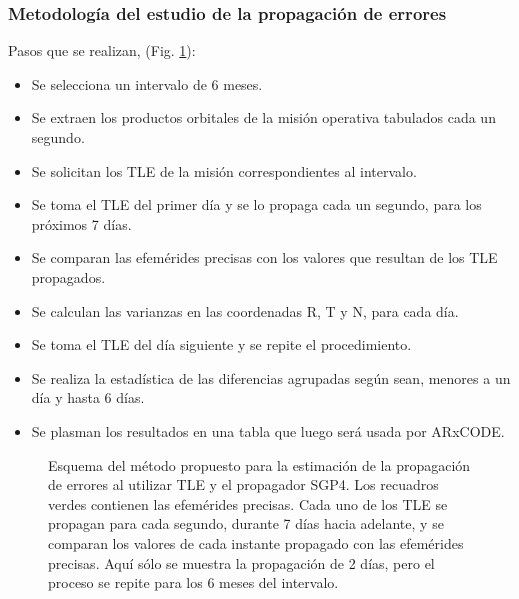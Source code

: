 {\subsubsection*{Metodolog\'ia del estudio de la propagaci\'on de errores}\label{subsec:errorProp}
Pasos que se realizan, (Fig. \ref{fig:metodotabla}):
\begin{itemize}
\itemsep0em
\item Se selecciona un intervalo de 6 meses.
\item Se extraen los productos orbitales de la misi\'on operativa tabulados cada un segundo.
\item Se solicitan los TLE de la misi\'on correspondientes al intervalo.
\item Se toma el TLE del primer d\'ia y se lo propaga cada un segundo, para los pr\'oximos 7 d\'ias.
\item Se comparan las efem\'erides precisas con los valores que resultan de los TLE propagados.
\item Se calculan las varianzas en las coordenadas R, T y N, para cada d\'ia.
\item Se toma el TLE del d\'ia siguiente y se repite el procedimiento.
\item Se realiza la estad\'istica  de las diferencias agrupadas seg\'un sean, menores a un d\'ia y hasta 6 d\'ias.
\item Se plasman los resultados en una tabla que luego ser\'a usada por ARxCODE.
\end{itemize}

\begin{figure}[!h]
\centering
{}
\caption[Descripci\'on del m\'etodo propuesto para la propagaci\'on de errores]{Esquema del m\'etodo propuesto para la estimaci\'on de la propagaci\'on de errores al utilizar TLE y el propagador SGP4. Los recuadros verdes contienen las efem\'erides precisas. Cada uno de los TLE se propagan para cada segundo, durante 7 d\'ias hacia adelante, y se comparan los valores de cada instante propagado con las efem\'erides precisas. Aqu\'i s\'olo se muestra la propagaci\'on de 2 d\'ias, pero el proceso se repite para los 6 meses del intervalo.}
\label{fig:metodotabla}
\end{figure}

}
